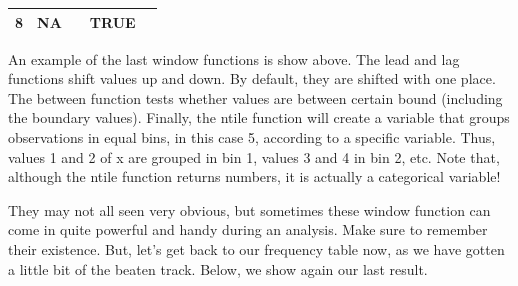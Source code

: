 \documentclass[]{tufte-book}
\newenvironment{Shaded}{}{}
\newcommand{\DataTypeTok}[1]{\textcolor[rgb]{0.56,0.13,0.00}{#1}}
\newcommand{\KeywordTok}[1]{\textcolor[rgb]{0.00,0.44,0.13}{\textbf{#1}}}
\newcommand{\NormalTok}[1]{#1}
\newcommand{\OperatorTok}[1]{\textcolor[rgb]{0.40,0.40,0.40}{#1}}
\newcommand{\StringTok}[1]{\textcolor[rgb]{0.25,0.44,0.63}{#1}}
\begin{document}
\begin{longtable}[]{@{}ccccc@{}}
\begin{minipage}[t]{0.06\columnwidth}
8\strut
\end{minipage} & \begin{minipage}[t]{0.08\columnwidth}\centering
NA\strut
\end{minipage} & \begin{minipage}[t]{0.07\columnwidth}\centering
5\strut
\end{minipage} & \begin{minipage}[t]{0.23\columnwidth}\centering
TRUE\strut
\end{minipage} & \begin{minipage}[t]{0.17\columnwidth}\centering
4\strut
\end{minipage}\tabularnewline
\bottomrule
\end{longtable}

An example of the last window functions is show above. The lead and lag functions shift values up and down. By default, they are shifted with one place. The between function tests whether values are between certain bound (including the boundary values). Finally, the ntile function will create a variable that groups observations in equal bins, in this case 5, according to a specific variable. Thus, values 1 and 2 of x are grouped in bin 1, values 3 and 4 in bin 2, etc. Note that, although the ntile function returns numbers, it is actually a categorical variable!

They may not all seen very obvious, but sometimes these window function can come in quite powerful and handy during an analysis. Make sure to remember their existence. But, let's get back to our frequency table now, as we have gotten a little bit of the beaten track. Below, we show again our last result.

\begin{Shaded}
\end{Shaded}
\end{document}
